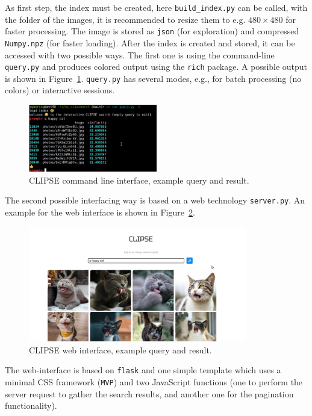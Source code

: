 \documentclass{article}
\begin{document}
As first step, the index must be created, here \lstinline[language={bash}]{build_index.py} can be called, with the folder of the images, it is recommended to resize them to e.g. $480\times480$ for faster processing.
The image is stored as \texttt{json} (for exploration) and compressed \texttt{Numpy.npz} (for faster loading).
After the index is created and stored, it can be accessed with two possible ways.
The first one is using the command-line \lstinline[language={bash}]{query.py} and produces colored output using the \texttt{rich} package.
A possible output is shown in Figure~\ref{fig:cli}.
\lstinline[language={bash}]{query.py} has several modes, e.g., for batch processing (no colors) or interactive sessions.

\begin{figure}
\centering
\includegraphics[width=0.5\textwidth]{CLI.jpg}
\caption{CLIPSE command line interface, example query and result.}
\label{fig:cli}
\end{figure}

The second possible interfacing way is based on a web technology \lstinline[language={bash}]{server.py}.
An example for the web interface is shown in Figure~\ref{fig:web}.

\begin{figure}
\centering
\includegraphics[width=0.85\textwidth]{WEB.jpg}
\caption{CLIPSE web interface, example query and result.}
\label{fig:web}
\end{figure}

The web-interface is based on \texttt{flask} and one simple template which uses a minimal CSS framework (\texttt{MVP}) and two JavaScript functions (one to perform the server request to gather the search results, and another one for the pagination functionality).
\end{document}
